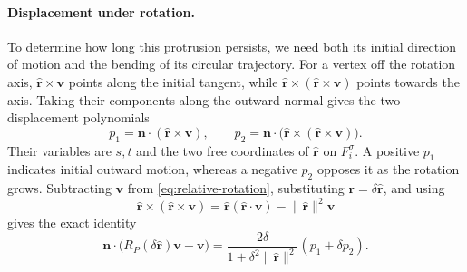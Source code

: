 \paragraph{Displacement under rotation.}
To determine how long this protrusion persists,
we need both its initial direction of motion and the bending of its
circular trajectory. For a vertex off the rotation axis,
$\widehat{\mathbf r}\times\mathbf v$ points along the initial tangent,
while $\widehat{\mathbf r}\times(\widehat{\mathbf r}\times\mathbf v)$
points towards the axis. Taking their components along the outward
normal gives the two displacement polynomials
\begin{equation}\label{eq:local-displacement-polynomials}
  p_1=\mathbf n\cdot(\widehat{\mathbf r}\times\mathbf v),
  \qquad
  p_2=\mathbf n\cdot
       \bigl(\widehat{\mathbf r}\times
                    (\widehat{\mathbf r}\times\mathbf v)\bigr).
\end{equation}
Their variables are $s,t$ and the two free coordinates of
$\widehat{\mathbf r}$ on $F_i^\sigma$. A positive $p_1$ indicates
initial outward motion, whereas a negative $p_2$ opposes it as the
rotation grows. Subtracting $\mathbf v$ from
\cref{eq:relative-rotation}, substituting
$\mathbf r=\delta\widehat{\mathbf r}$, and using
\[
  \widehat{\mathbf r}\times
    (\widehat{\mathbf r}\times\mathbf v)
  =\widehat{\mathbf r}(\widehat{\mathbf r}\cdot\mathbf v)
     -\lVert\widehat{\mathbf r}\rVert^2\mathbf v
\]
gives the exact identity
\begin{equation}\label{eq:local-radial-displacement}
  \mathbf n\cdot
    \bigl(R_P(\delta\widehat{\mathbf r})\mathbf v-\mathbf v\bigr)
   =\frac{2\delta}
          {1+\delta^2\lVert\widehat{\mathbf r}\rVert^2}
       (p_1+\delta p_2).
\end{equation}

